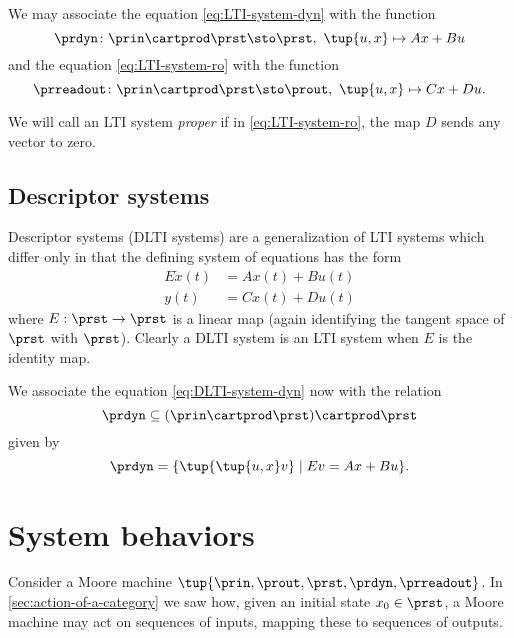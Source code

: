 We may associate the equation \cref{eq:LTI-system-dyn} with the function 
\begin{equation}
\prdyn \colon  \prin \cartprod \prst \sto \prst, \ \tup{u, x} \mapsto Ax + Bu
\end{equation}
and the equation \cref{eq:LTI-system-ro} with the function 
\begin{equation}
\prreadout \colon \prin \cartprod \prst \sto \prout, \ \tup{u,x} \mapsto Cx + Du.
\end{equation}

We will call an LTI system \emph{proper} if in \cref{eq:LTI-system-ro}, the map $D$ sends any vector to zero. 


\subsection{Descriptor systems}

Descriptor systems (DLTI systems) are a generalization of LTI systems which differ only in that the defining system of equations has the form
\begin{align}
        E \dot x(t) &= Ax(t) + Bu(t) \label{eq:DLTI-system-dyn} \\
        y(t) &= Cx(t) + Du(t) \label{eq:DLTI-system-ro}
\end{align}
where $E: \prst \to \prst$ is a linear map (again identifying the tangent space of $\prst$ with $\prst$). Clearly a DLTI system is an LTI system when $E$ is the identity map. 

We associate the equation \cref{eq:DLTI-system-dyn} now with the relation 
\begin{equation}
\prdyn \subseteq  (\prin \cartprod \prst) \cartprod \prst
\end{equation}
given by 
\begin{equation}
\prdyn = \{ \tup{ \tup{u, x} v} \mid E v = Ax + Bu \}.
\end{equation}



\section{System behaviors}


Consider a Moore machine $\tup{\prin, \prout, \prst, \prdyn, \prreadout}$. 
In \cref{sec:action-of-a-category} we saw how, given an initial state $x_0 \in \prst$, a Moore machine may act on sequences of inputs, mapping these to sequences of outputs. 

